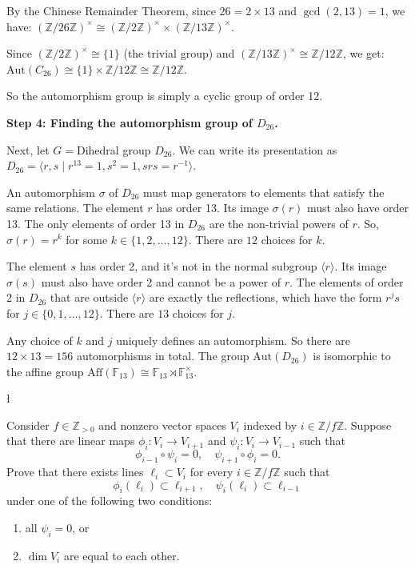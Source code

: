 \begin{solution}
By the Chinese Remainder Theorem, since $26 = 2 \times 13$ and $\gcd(2, 13) = 1$, we have:
$(\mathbb{Z}/26\mathbb{Z})^\times \cong (\mathbb{Z}/2\mathbb{Z})^\times \times (\mathbb{Z}/13\mathbb{Z})^\times$.

Since $(\mathbb{Z}/2\mathbb{Z})^\times \cong \{1\}$ (the trivial group) and $(\mathbb{Z}/13\mathbb{Z})^\times \cong \mathbb{Z}/12\mathbb{Z}$, we get:
$\text{Aut}(C_{26}) \cong \{1\} \times \mathbb{Z}/12\mathbb{Z} \cong \mathbb{Z}/12\mathbb{Z}$.

So the automorphism group is simply a cyclic group of order 12.

\textbf{Step 4: Finding the automorphism group of $D_{26}$.}

Next, let $G = $Dihedral group $D_{26}$. We can write its presentation as $D_{26} = \langle r, s \mid r^{13}=1, s^2=1, srs=r^{-1} \rangle$.

An automorphism $\sigma$ of $D_{26}$ must map generators to elements that satisfy the same relations.
The element $r$ has order 13. Its image $\sigma(r)$ must also have order 13. The only elements of order 13 in $D_{26}$ are the non-trivial powers of $r$. So, $\sigma(r) = r^k$ for some $k \in \{1, 2, \dots, 12\}$. There are $12$ choices for $k$.

The element $s$ has order 2, and it's not in the normal subgroup $\langle r \rangle$. Its image $\sigma(s)$ must also have order 2 and cannot be a power of $r$. The elements of order 2 in $D_{26}$ that are outside $\langle r \rangle$ are exactly the reflections, which have the form $r^j s$ for $j \in \{0, 1, \dots, 12\}$. There are $13$ choices for $j$.

Any choice of $k$ and $j$ uniquely defines an automorphism. So there are $12 \times 13 = 156$ automorphisms in total.
The group $\text{Aut}(D_{26})$ is isomorphic to the affine group $\text{Aff}(\mathbb{F}_{13}) \cong \mathbb{F}_{13} \rtimes \mathbb{F}_{13}^\times$.
\end{solution}

\begin{exercise}
\l\label{2013:2}

\label{algebra:2013:2}Consider $f \in \mathbb{Z}_{>0}$ and nonzero vector spaces $V_i$ indexed by $i \in \mathbb{Z}/f\mathbb{Z}$. Suppose that there are linear maps $\phi_i: V_i \to V_{i+1}$ and $\psi_i: V_i \to V_{i-1}$ such that
\[ \phi_{i-1} \circ \psi_i = 0, \quad \psi_{i+1} \circ \phi_i = 0. \]
Prove that there exists lines $\ell_i \subset V_i$ for every $i \in \mathbb{Z}/f\mathbb{Z}$ such that
\[ \phi_i(\ell_i) \subset \ell_{i+1}, \quad \psi_i(\ell_i) \subset \ell_{i-1} \]
under one of the following two conditions:
\begin{enumerate}
    \item all $\psi_i = 0$, or
    \item $\dim V_i$ are equal to each other.
\end{enumerate}
\end{exercise}

